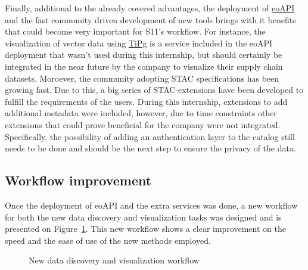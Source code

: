 \documentclass[
  oneside,
  open=any]{scrbook}
\begin{document}
Finally, additional to the already covered advantages, the deployment of
\href{www.eoapi.dev}{eoAPI} and the fast community driven development of
new tools brings with it benefits that could become very important for
S11's workflow. For instance, the visualization of vector data using
\href{https://github.com/developmentseed/tipg}{TiPg} is a service
included in the eoAPI deployment that wasn't used during this
internship, but should certainly be integrated in the near future by the
company to visualize their supply chain datasets. Moroever, the
community adopting STAC specifications has been growing fast. Due to
this, a big series of STAC-extensions have been developed to fulfill the
requirements of the users. During this internship, extensions to add
additional metadata were included, however, due to time constraints
other extensions that could prove beneficial for the company were not
integrated. Specifically, the possibility of adding an authentication
layer to the catalog still needs to be done and should be the next step
to ensure the privacy of the data.

\subsection{Workflow improvement}\label{workflow-improvement}

Once the deployment of eoAPI and the extra services was done, a new
workflow for both the new data discovery and visualization tasks was
designed and is presented on Figure~\ref{fig-new-workflow}. This new
workflow shows a clear improvement on the speed and the ease of use of
the new methods employed.

\begin{figure}[H]


\caption{\label{fig-new-workflow}New data discovery and visualization
workflow}

\end{figure}%
\end{document}
